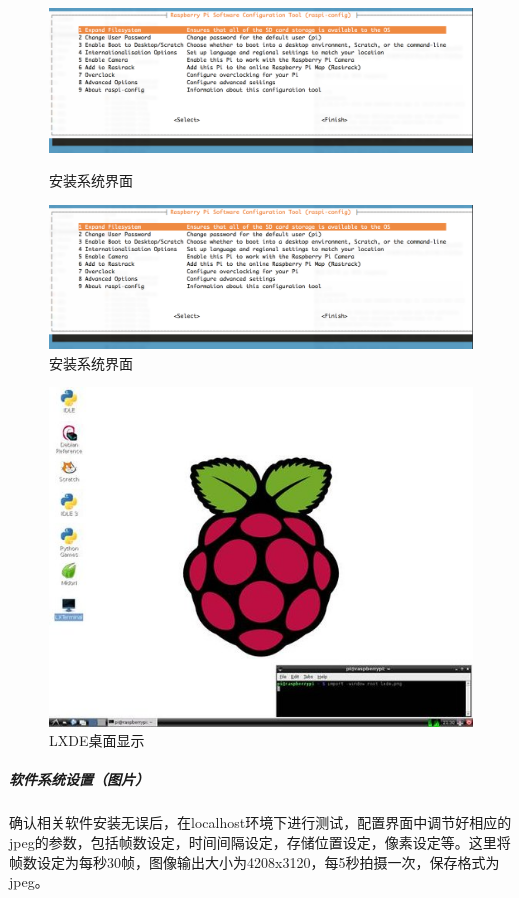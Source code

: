 \begin{figure}[h]
	\begin{minipage}[t]{0.5\linewidth}
\centering
\includegraphics[width=0.7\linewidth]{Figure/rasp_config}
\caption{安装系统界面 }
\label{fig:rasp_4}
	\end{minipage}
	\begin{minipage}[t]{0.5\linewidth}
		\centering
		\includegraphics[width=0.7\linewidth]{Figure/rasp_config}
		\caption{安装系统界面 }
		\label{fig:rasp_4}
	\end{minipage}
\end{figure}


\begin{figure}[h]
	\begin{minipage}[t]{0.5\linewidth}
\centering
\includegraphics[width=0.5\linewidth]{Figure/rasp_dasktopjpg}
\caption{LXDE桌面显示}
\label{fig:rasp_dasktopjpg}
	\end{minipage}
\end{figure}


\subparagraph{软件系统设置（图片）}
确认相关软件安装无误后，在localhost环境下进行测试，配置界面中调节好相应的jpeg的参数，包括帧数设定，时间间隔设定，存储位置设定，像素设定等。这里将帧数设定为每秒30帧，图像输出大小为4208x3120，每5秒拍摄一次，保存格式为jpeg。

